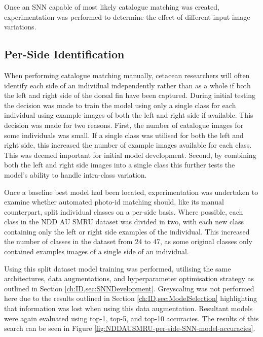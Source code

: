 Once an SNN capable of most likely catalogue matching was created, experimentation was performed to determine the effect of different input image variations.

\subsection{Per-Side Identification}\label{ch:ID,sec:EffectOfInputImageVariation,subsec:perSide}

When performing catalogue matching manually, cetacean researchers will often identify each side of an individual independently rather than as a whole if both the left and right side of the dorsal fin have been captured. During initial testing the decision was made to train the model using only a single class for each individual using example images of both the left and right side if available. This decision was made for two reasons. First, the number of catalogue images for some individuals was small. If a single class was utilised for both the left and right side, this increased the number of example images available for each class. This was deemed important for initial model development. Second, by combining both the left and right side images into a single class this further tests the model's ability to handle intra-class variation. 

Once a baseline best model had been located, experimentation was undertaken to examine whether automated photo-id matching should, like its manual counterpart, split individual classes on a per-side basis. Where possible, each class in the NDD AU SMRU dataset was divided in two, with each new class containing only the left or right side examples of the individual. This increased the number of classes in the dataset from 24 to 47, as some original classes only contained examples images of a single side of an individual.

Using this split dataset model training was performed, utilising the same architectures, data augmentations, and hyperparameter optimisation strategy as outlined in Section \ref{ch:ID,sec:SNNDevelopment}. Greyscaling was not performed here due to the results outlined in Section \ref{ch:ID,sec:ModelSelection} highlighting that information was lost when using this data augmentation. Resultant models were again evaluated using top-1, top-5, and top-10 accuracies. The results of this search can be seen in Figure \ref{fig:NDDAUSMRU-per-side-SNN-model-accuracies}.
		
